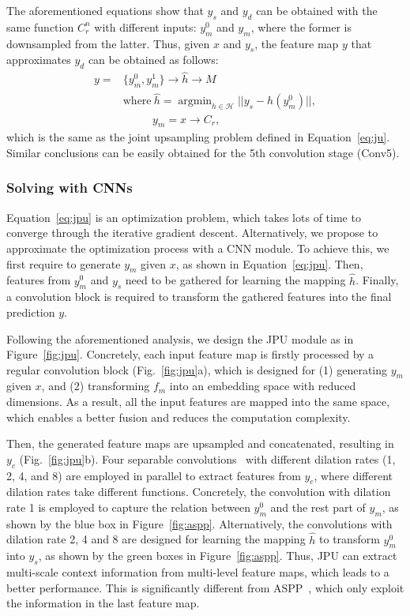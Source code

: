 \documentclass[10pt,twocolumn,letterpaper]{article}
\DeclareMathOperator*{\argmin}{argmin}
\begin{document}
The aforementioned equations show that $y_s$ and $y_d$ can be obtained with the same function $C_r^n$ with different inputs: $y_m^0$ and $y_m$, where the former is downsampled from the latter.
Thus, given $x$ and $y_s$, the feature map $y$ that approximates $y_d$ can be obtained as follows:
\begin{equation}
	\begin{aligned}
		y = &\{y_m^{0}, y_m^{1}\}\to \hat{h}\to M \\
		    &\text{where} ~\hat{h} = \argmin_{h\in \mathcal{H}} ||y_s - h(y_m^{0})||,\\
		    &\quad\quad~~~y_m = x\to C_r,
	\end{aligned}
	\label{eq:jpu}
\end{equation}
which is the same as the joint upsampling problem defined in Equation~\ref{eq:ju}.
Similar conclusions can be easily obtained for the 5th convolution stage (Conv5).
\subsubsection{Solving with CNNs}
\quad Equation~\ref{eq:jpu} is an optimization problem, which takes lots of time to converge through the iterative gradient descent.
Alternatively, we propose to approximate the optimization process with a CNN module.
To achieve this, we first require to generate $y_m$ given $x$, as shown in Equation~\ref{eq:jpu}.
Then, features from $y_m^0$ and $y_s$ need to be gathered for learning the mapping $\hat{h}$.
Finally, a convolution block is required to transform the gathered features into the final prediction $y$.

Following the aforementioned analysis, we design the JPU module as in Figure~\ref{fig:jpu}. 
Concretely, each input feature map is firstly processed by a regular convolution block (Fig.~\ref{fig:jpu}a), which is designed for (1) generating $y_m$ given $x$, and (2) transforming $f_m$ into an embedding space with reduced dimensions.
As a result, all the input features are mapped into the same space, which enables a better fusion and reduces the computation complexity.

Then, the generated feature maps are upsampled and concatenated, resulting in $y_c$ (Fig.~\ref{fig:jpu}b).
Four separable convolutions~\cite{howard2017mobilenets,chollet2017xception} with different dilation rates (1, 2, 4, and 8) are employed in parallel to extract features from $y_c$, where different dilation rates take different functions.
Concretely, the convolution with dilation rate 1 is employed to capture the relation between $y_m^{0}$ and the rest part of $y_m$, as shown by the blue box in Figure~\ref{fig:aspp}.
Alternatively, the convolutions with dilation rate 2, 4 and 8 are designed for learning the mapping $\hat{h}$ to transform $y_m^{0}$ into $y_s$, as shown by the green boxes in Figure~\ref{fig:aspp}.
Thus, JPU can extract multi-scale context information from multi-level feature maps, which leads to a better performance.
This is significantly different from ASPP~\cite{chen2017rethinking}, which only exploit the information in the last feature map.
\end{document}
